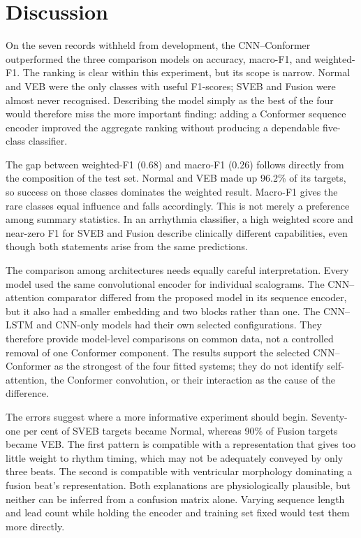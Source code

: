 \section{Discussion}

On the seven records withheld from development, the CNN--Conformer outperformed the three comparison models on accuracy, macro-F1, and weighted-F1. The ranking is clear within this experiment, but its scope is narrow. Normal and VEB were the only classes with useful F1-scores; SVEB and Fusion were almost never recognised. Describing the model simply as the best of the four would therefore miss the more important finding: adding a Conformer sequence encoder improved the aggregate ranking without producing a dependable five-class classifier.

The gap between weighted-F1 (0.68) and macro-F1 (0.26) follows directly from the composition of the test set. Normal and VEB made up 96.2\% of its targets, so success on those classes dominates the weighted result. Macro-F1 gives the rare classes equal influence and falls accordingly. This is not merely a preference among summary statistics. In an arrhythmia classifier, a high weighted score and near-zero F1 for SVEB and Fusion describe clinically different capabilities, even though both statements arise from the same predictions.

The comparison among architectures needs equally careful interpretation. Every model used the same convolutional encoder for individual scalograms. The CNN--attention comparator differed from the proposed model in its sequence encoder, but it also had a smaller embedding and two blocks rather than one. The CNN--LSTM and CNN-only models had their own selected configurations. They therefore provide model-level comparisons on common data, not a controlled removal of one Conformer component. The results support the selected CNN--Conformer as the strongest of the four fitted systems; they do not identify self-attention, the Conformer convolution, or their interaction as the cause of the difference.

The errors suggest where a more informative experiment should begin. Seventy-one per cent of SVEB targets became Normal, whereas 90\% of Fusion targets became VEB. The first pattern is compatible with a representation that gives too little weight to rhythm timing, which may not be adequately conveyed by only three beats. The second is compatible with ventricular morphology dominating a fusion beat's representation. Both explanations are physiologically plausible, but neither can be inferred from a confusion matrix alone. Varying sequence length and lead count while holding the encoder and training set fixed would test them more directly.

